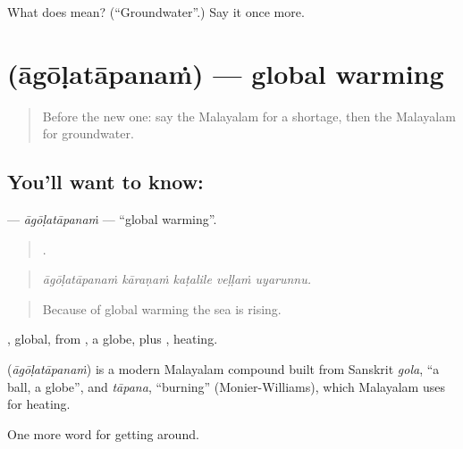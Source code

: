 \begin{tcolorbox}[breakable,colback=teal!4,colframe=teal!35!black,title={Before you move on}]
What does  mean? (\textquotedblleft{}Groundwater\textquotedblright{}.) Say it once more.
\end{tcolorbox}
\section[\texorpdfstring{\ml{ആഗോളതാപനം} (āgōḷatāpanaṁ)}{ആഗോളതാപനം (āgōḷatāpanaṁ)}]{ (āgōḷatāpanaṁ) — global warming}

\label{lesson:ML-C505-agolatapanam}



\begin{quote}
Before the new one: say the Malayalam for a shortage, then the Malayalam for groundwater.
\end{quote}

\subsection*{You'll want to know: }
\textbf{} — \emph{āgōḷatāpanaṁ} — \textquotedblleft{}global warming\textquotedblright{}.

\begin{quote}
    .
\end{quote}

\begin{quote}
\emph{āgōḷatāpanaṁ kāraṇaṁ kaṭalile veḷḷaṁ uyarunnu.}
\end{quote}

\begin{quote}
Because of global warming the sea is rising.
\end{quote}

, global, from , a globe, plus , heating.

\begin{cousinweb}
\textbf{} (\emph{āgōḷatāpanaṁ}) is a modern Malayalam compound built from Sanskrit \emph{gola}, \textquotedblleft{}a ball, a globe\textquotedblright{}, and \emph{tāpana}, \textquotedblleft{}burning\textquotedblright{} (Monier-Williams), which Malayalam uses for heating.
\end{cousinweb}

\begin{grammarlens}[title={What you've built}]
One more word for getting around.
\end{grammarlens}

